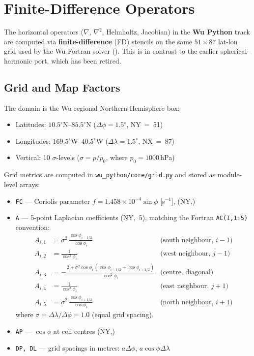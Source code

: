 \chapter{Finite-Difference Operators}
\label{chap:fd}

The horizontal operators ($\nabla$, $\nabla^2$, Helmholtz, Jacobian) in the
\textbf{Wu Python} track are computed via \textbf{finite-difference} (FD) stencils
on the same $51\times87$ lat-lon grid used by the Wu Fortran solver
().  This is in contrast to the earlier spherical-harmonic
port, which has been retired.

\section{Grid and Map Factors}

The domain is the Wu regional Northern-Hemisphere box:
\begin{itemize}
  \item Latitudes: $10.5^\circ$N--$85.5^\circ$N ($\Delta\phi = 1.5^\circ$, NY~=~51)
  \item Longitudes: $169.5^\circ$W--$40.5^\circ$W ($\Delta\lambda = 1.5^\circ$, NX~=~87)
  \item Vertical: 10 $\sigma$-levels ($\sigma = p/p_0$, where $p_0=1000$\,hPa)
\end{itemize}

Grid metrics are computed in \texttt{wu\_python/core/grid.py} and stored as
module-level arrays:
\begin{itemize}
  \item \texttt{FC} --- Coriolis parameter $f = 1.458\times10^{-4}\sin\phi$ [s$^{-1}$], (NY,)
  \item \texttt{A} --- 5-point Laplacian coefficients (NY,~5), matching the
        Fortran \texttt{AC(I,1:5)} convention:
        \begin{align*}
          A_{i,1} &= \sigma^2\,\frac{\cos\phi_{i-1/2}}{\cos\phi_i}
          &\text{(south neighbour, } i-1\text{)}\\
          A_{i,2} &= \frac{1}{\cos^2\phi_i}
          &\text{(west neighbour,  } j-1\text{)}\\
          A_{i,3} &= -\frac{2 + \sigma^2\cos\phi_i\,(\cos\phi_{i-1/2}+\cos\phi_{i+1/2})}
                         {\cos^2\phi_i}
          &\text{(centre, diagonal)}\\
          A_{i,4} &= \frac{1}{\cos^2\phi_i}
          &\text{(east neighbour,  } j+1\text{)}\\
          A_{i,5} &= \sigma^2\,\frac{\cos\phi_{i+1/2}}{\cos\phi_i}
          &\text{(north neighbour, } i+1\text{)}
        \end{align*}
        where $\sigma = \Delta\lambda/\Delta\phi = 1.0$ (equal grid spacing).
  \item \texttt{AP} --- $\cos\phi$ at cell centres (NY,)
  \item \texttt{DP, DL} --- grid spacings in metres: $a\Delta\phi$, $a\cos\phi\Delta\lambda$
\end{itemize}

